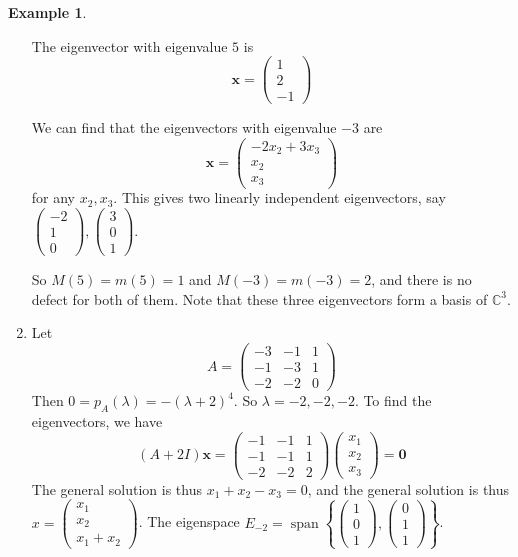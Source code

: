 \documentclass[a4paper]{article}
\theoremstyle{definition}
\newtheorem*{eg}{Example}
\newcommand{\mb}[1]{\mathbf{#1}}
\newcommand{\C}{\mathbb{C}}
\DeclareMathOperator\spn{span}
\begin{document}
\begin{eg}
\begin{enumerate}
     The eigenvector with eigenvalue $5$ is
     \[
     \mb{x} =
     \begin{pmatrix}
       1\\2\\-1
     \end{pmatrix}
     \]

     We can find that the eigenvectors with eigenvalue $-3$ are
     \[
     \mb{x} =
     \begin{pmatrix}
       -2x_2 + 3x_3\\x_2\\x_3
     \end{pmatrix}
     \]
     for any $x_2, x_3$. This gives two linearly independent eigenvectors, say $
     \begin{pmatrix}
       -2\\1\\0
     \end{pmatrix},
     \begin{pmatrix}
       3\\0\\1
     \end{pmatrix}$.

     So $M(5) = m(5) = 1$ and $M(-3) = m(-3) = 2$, and there is no defect for both of them. Note that these three eigenvectors form a basis of $\C^3$.
   \item Let
     \[
     A = \begin{pmatrix}
       -3&-1&1\\
       -1 & -3 & 1\\
       -2 & -2 & 0
     \end{pmatrix}
     \]
     Then $0 = p_A(\lambda) = -(\lambda+2)^4$. So $\lambda = -2, -2, -2$. To find the eigenvectors, we have
     \[
     (A + 2I)\mb{x} = 
     \begin{pmatrix}
       -1&-1&1\\
       -1 & -1 & 1\\
       -2 & -2 & 2
     \end{pmatrix}
     \begin{pmatrix}
       x_1\\x_2\\x_3
     \end{pmatrix}
     = \mb{0}
     \]
     The general solution is thus $x_1 + x_2 - x_3 = 0$, and the general solution is thus $x = 
     \begin{pmatrix}
       x_1\\x_2\\x_1 + x_2
     \end{pmatrix}$. The eigenspace $E_{-2} = \spn\left\{
     \begin{pmatrix}
       1\\0\\1
     \end{pmatrix}, 
     \begin{pmatrix}
       0\\1\\1
     \end{pmatrix}\right\}$.


\end{enumerate}
\end{eg}
\end{document}
